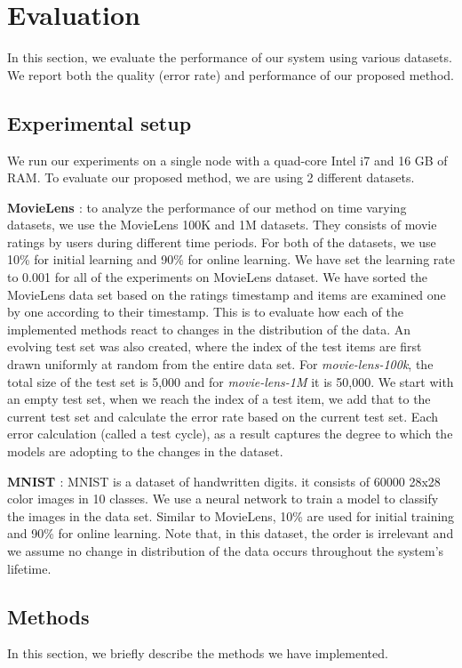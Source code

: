 \documentclass{vldb}
\begin{document}
\section{Evaluation} \label{evaluation} 
In this section, we evaluate the performance of our system using various datasets. 
We report both the quality (error rate) and performance of our proposed method. 

\subsection{Experimental setup}
We run our experiments on a single node with a quad-core Intel i7 and 16 GB of RAM. 
To evaluate our proposed method, we are using 2 different datasets.

\textbf{MovieLens \cite{harper2016movielens}}: to analyze the performance of our method on time varying datasets, we use the MovieLens 100K and 1M datasets. 
They consists of movie ratings by users during different time periods. 
For both of the datasets, we use 10\% for initial learning and 90\% for online learning. 
We have set the learning rate to 0.001 for all of the experiments on MovieLens dataset.
We have sorted the MovieLens data set based on the ratings timestamp and items are examined one by one according to their timestamp.
This is to evaluate how each of the implemented methods react to changes in the distribution of the data.
An evolving test set was also created, where the index of the test items are first drawn uniformly at random from the entire data set.
For \textit{movie-lens-100k}, the total size of the test set is 5,000 and for \textit{movie-lens-1M} it is 50,000.
We start with an empty test set, when we reach the index of a test item, we add that to the current test set and calculate the error rate based on the current test set.
Each error calculation (called a test cycle), as a result captures the degree to which the models are adopting to the changes in the dataset.

\textbf{MNIST \cite{lecun-mnist}}: MNIST is a dataset of handwritten digits.
it consists of 60000 28x28 color images in 10 classes. We use a neural network to train a model to classify the images in the data set. 
Similar to MovieLens, 10\% are used for initial training and 90\% for online learning. 
Note that, in this dataset, the order is irrelevant and we assume no change in distribution of the data occurs throughout the system's lifetime. 

\subsection{Methods}
In this section, we briefly describe the methods we have implemented.
\end{document}
